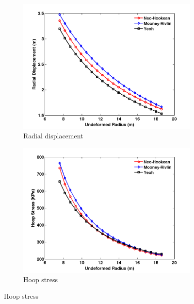 \begin{figure}[H]
	\begin{subfigure}[b]{0.5\textwidth}
		\centering
		\includegraphics[width=\textwidth]{./figures/ur_models.png}
		\caption{Radial displacement}
		\label{ur_models}
	\end{subfigure}
	\begin{subfigure}[b]{0.5\textwidth}
		\centering
		\includegraphics[width=\textwidth]{./figures/hoop_models.png}
		\caption{Hoop stress}
		\label{hoop_models}
	\end{subfigure}
	

\end{figure}
